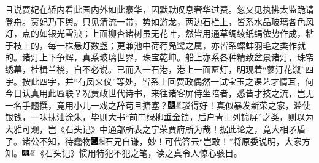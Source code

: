 且说贾妃在轿内看此园内外如此豪华，因默默叹息奢华过费。忽又见执拂太监跪请登舟。贾妃乃下舆。只见清流一带，势如游龙，两边石栏上，皆系水晶玻璃各色风灯，点的如银光雪浪；上面柳杏诸树虽无花叶，然皆用通草绸绫纸绢依势作成，粘于枝上的，每一株悬灯数盏；更兼池中荷荇凫鹭之属，亦皆系螺蚌羽毛之类作就的。诸灯上下争辉，真系玻璃世界，珠宝乾坤。船上亦系各种精致盆景诸灯，珠帘绣幕，桂楫兰桡，自不必说。已而入一石港，港上一面匾灯，明现着“蓼汀花溆”四字。按此四字，并“有凤来仪”等处，皆系上回贾政偶然一试宝玉之课艺才情耳，何今日认真用此匾联？况贾政世代诗书，来往诸客屏侍坐陪者，悉皆才技之流，岂无一名手题撰，竟用小儿一戏之辞苟且搪塞？{\includegraphics[width=3mm]{../Images/00004}\includegraphics[width=3mm]{../Images/00010}\footnotesize \kaishu 驳得好！}真似暴发新荣之家，滥使银钱，一味抹油涂朱，毕则大书“前门绿柳垂金锁，后户青山列锦屏”之类，则以为大雅可观，岂《石头记》中通部所表之宁荣贾府所为哉！据此论之，竟大相矛盾了。诸公不知，待蠢物{\includegraphics[width=3mm]{../Images/00003}\includegraphics[width=3mm]{../Images/00012}\footnotesize \kaishu 石兄自谦，妙！可代答云“岂敢！”}将原委说明，大家方知。{\includegraphics[width=3mm]{../Images/00004}\includegraphics[width=3mm]{../Images/00010}\footnotesize \kaishu 《石头记》惯用特犯不犯之笔，读之真令人惊心骇目。}

